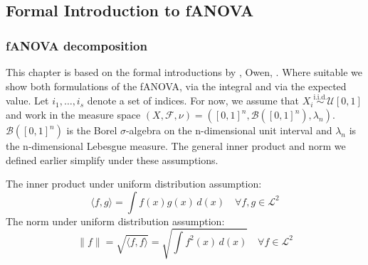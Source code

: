

\subsection{Formal Introduction to fANOVA}

\subsubsection*{fANOVA decomposition}
This chapter is based on the formal introductions by \cite{sobol1993sensitivity, sobol2001, hooker2004}, Owen, \cite{muehlenstaedt2012}. Where suitable we show both formulations of the fANOVA, via the integral and via the expected value.
Let $i_1, \dots , i_s$ denote a set of indices. For now, we assume that $X_i \overset{\text{i.i.d.}}{\sim} \mathcal{U}[0, 1]$ and work in the measure space $(X, \mathcal{F}, \nu) = ([0, 1]^n, \mathcal{B}([0, 1]^n), \lambda_{n})$. $\mathcal{B}([0, 1]^n)$ is the Borel $\sigma$-algebra on the n-dimensional unit interval and $\lambda_{n}$ is the n-dimensional Lebesgue measure. 
The general inner product and norm we defined earlier simplify under these assumptions.\par
The inner product under uniform distribution assumption:
\[
\langle f, g \rangle = \int f(x) g(x) \, d(x) \quad \forall f, g \in \mathcal{L}^2
\]
The norm under uniform distribution assumption:
\[
\|f\| = \sqrt{\langle f, f \rangle} = \sqrt{\int f^2(x) \, d(x)} \quad \forall f \in \mathcal{L}^2
\]


